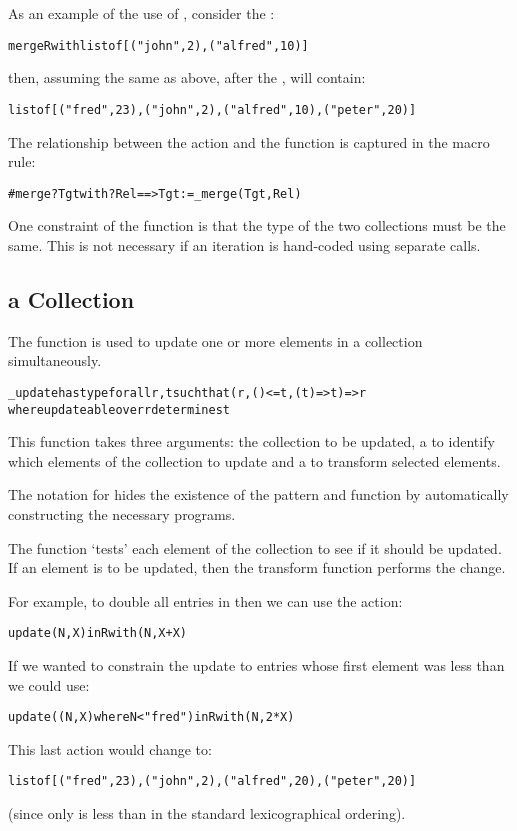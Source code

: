 As an example of the use of , consider the :
\begin{alltt}
merge R with list of [ ("john",2), ("alfred",10) ]
\end{alltt}
then, assuming the same  as above, after the ,  will contain:
\begin{alltt}
list of [ ("fred", 23), ("john",2), ("alfred",10), ("peter",20) ]
\end{alltt}

The relationship between the  action and the  function is captured in the macro rule:
\begin{alltt}
#merge ?Tgt with ?Rel ==> Tgt := \_merge(Tgt,Rel)
\end{alltt}

\begin{aside}
One constraint of the  function is that the type of the two collections must be the same. This is not necessary if an iteration is hand-coded using separate  calls.
\end{aside}

\subsection{ a Collection}
\label{update}
The  function is used to update one or more elements in a collection simultaneously.
\begin{alltt}
\_update has type for all r,t such that (r, ()<=t, (t)=>t) => r
                  where updateable over r determines t
\end{alltt}
This function takes three arguments: the collection to be updated, a  to identify which elements of the collection to update and a  to transform selected elements.

\begin{aside}
The  notation for  hides the existence of the pattern and function by automatically constructing the necessary programs.
\end{aside}

The  function `tests' each element of the collection to see if it should be updated. If an element is to be updated, then the transform function performs the change.

For example, to double all entries in  then we can use the action:
\begin{alltt}
update (N,X) in R with (N,X+X)
\end{alltt}
If we wanted to constrain the update to entries whose first element was less than  we could use:
\begin{alltt}
update ((N,X) where N<"fred") in R with (N,2*X)
\end{alltt}
This last action would change  to:
\begin{alltt}
list of [ ("fred", 23), ("john",2), ("alfred",20), ("peter",20) ]
\end{alltt}
(since only  is less than  in the standard lexicographical ordering).

